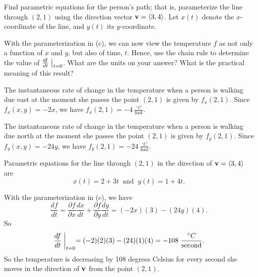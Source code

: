 \begin{pa}
	Find parametric equations for the person's path; that is, parameterize the line through $(2,1)$ using the direction vector $\mathbf{v} = \langle 3, 4 \rangle$.  Let $x(t)$ denote the $x$-coordinate of the line, and $y(t)$ its $y$-coordinate.
	
	\item With the parameterization in (c), we can now view the temperature $f$ as not only a function of $x$ and $y$, but also of time, $t$.  Hence, use the chain rule to determine the value of $\frac{df}{dt}\bigm|_{t=0}$.  What are the units on your answer?  What is the practical meaning of this result?
  \ea
  


\end{pa}

\begin{activitySolution} 
  \ba
  	\item The instantaneous rate of change in the temperature when a person is walking due east at the moment she passes the point $(2,1)$ is given by $f_x(2,1)$. Since $f_x(x,y) = -2x$, we have $f_x(2,1) = -4 \ \frac{^{\circ}C}{\text{foot}}$. 
  	
	\item The instantaneous rate of change in the temperature when a person is walking due north at the moment she passes the point $(2,1)$ is given by $f_y(2,1)$. Since $f_y(x,y) = -24 y$, we have $f_y(2,1) = -24 \ \frac{^{\circ}C}{\text{foot}}$. 
	
	\item Parametric equations for the line through $(2,1)$ in the direction of $\mathbf{v} = \langle 3, 4 \rangle$ are
\[x(t) = 2 + 3t \ \text{ and } \ y(t)=1+4t.\]
	
	\item With the parameterization in (c), we have 
\[\frac{df}{dt} = \frac{\partial f}{\partial x} \frac{dx}{dt} + \frac{\partial f}{\partial y} \frac{dy}{dt} = (-2x)(3) - (24y)(4).\]
So
\[\frac{df}{dt}\biggm|_{t=0} = (-2)(2)(3) - (24)(1)(4) = -108 \ \frac{^{\circ}C}{\text{second}}.\]
So the temperature is decreasing by 108 degrees Celsius for every second she moves in the direction of $\mathbf{v}$ from the point $(2,1)$. 
  \ea
\end{activitySolution}

 \afterpa 